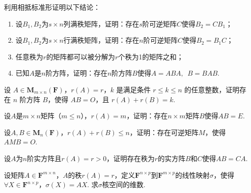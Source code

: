 \begin{exercise}
\begin{exgroup}
        \item 利用相抵标准形证明以下结论：
        \begin{enumerate}
            \item 设$B_1,B_2$为$s \times n$列满秩矩阵，证明：存在$s$阶可逆矩阵$C$使得$B_2=CB_1$；

            \item 设$B_1,B_2$为$s \times n$行满秩矩阵，证明：存在$n$阶可逆矩阵$C$使得$B_2=B_1C$；

            \item 任意秩为$r$的矩阵都可以被分解为$r$个秩为1的矩阵之和；

            \item 已知$A$是$n$阶方阵，证明：存在$n$阶方阵$B$使得$A=ABA,\enspace B=BAB$.
        \end{enumerate}

        \item 设 $A \in \mathbf{M}_{m \times n}(\mathbf{F})$，$r(A)=r$，$k$ 是满足条件 $r \leqslant k \leqslant n$ 的任意整数，证明存在 $n$ 阶方阵 $B$，使得 $AB=O$，且 $r(A)+r(B)=k$.

        \item 设$A$是$m \times n$矩阵（$m \leqslant n$），$r(A)=m$，证明：存在$n \times m$矩阵$B$使得$AB=E$.

        \item 设$A,B \in \mathbf{M}_n(\mathbf{F})$，$r(A)+r(B) \leqslant n$，证明：存在可逆矩阵$M$，使得$AMB=O$.

        \item 设$A$为$n$阶实方阵且$r(A)=r>0$，证明存在秩为$r$的实方阵$B$和$C$使得$AB=CA$. %
    \end{exgroup}

    \begin{exgroup}
        \item 设矩阵$A \in \mathbf{F}^{m \times n}$，$A$的秩$r(A)=r$，定义$\mathbf{F}^{n \times p}$到$\mathbf{F}^{m \times p}$的线性映射$\sigma$，使得$\forall X \in \mathbf{F}^{n \times p}$，$\sigma(X)=AX$. 求$\sigma$核空间的维数.
    \end{exgroup}
\end{exercise}
